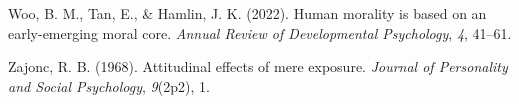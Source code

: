 \documentclass[10pt, letterpaper]{article}
\newenvironment{CSLReferences}%
  {}%
  {\par}
\begin{document}
\begin{CSLReferences}{1}{0}
\leavevmode{}%
Woo, B. M., Tan, E., \& Hamlin, J. K. (2022). Human morality is based on
an early-emerging moral core. \emph{Annual Review of Developmental
Psychology}, \emph{4}, 41--61.

\leavevmode{}%
Zajonc, R. B. (1968). Attitudinal effects of mere exposure.
\emph{Journal of Personality and Social Psychology}, \emph{9}(2p2), 1.

\end{CSLReferences}


\end{document}
